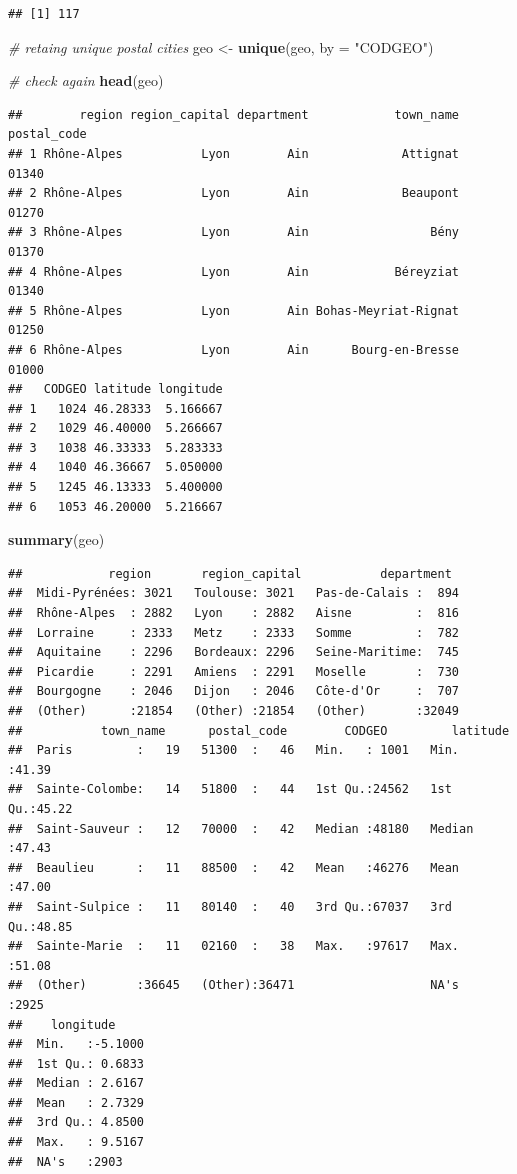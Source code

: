 \documentclass[]{article}
\newenvironment{Shaded}{\begin{snugshade}}{\end{snugshade}}
\newcommand{\KeywordTok}[1]{\textcolor[rgb]{0.13,0.29,0.53}{\textbf{#1}}}
\newcommand{\DataTypeTok}[1]{\textcolor[rgb]{0.13,0.29,0.53}{#1}}
\newcommand{\StringTok}[1]{\textcolor[rgb]{0.31,0.60,0.02}{#1}}
\newcommand{\CommentTok}[1]{\textcolor[rgb]{0.56,0.35,0.01}{\textit{#1}}}
\newcommand{\NormalTok}[1]{#1}
\begin{document}
\begin{verbatim}
## [1] 117
\end{verbatim}

\begin{Shaded}
\begin{Highlighting}[]
\CommentTok{# retaing unique postal cities}
\NormalTok{geo <-}\StringTok{ }\KeywordTok{unique}\NormalTok{(geo, }\DataTypeTok{by =} \StringTok{"CODGEO"}\NormalTok{)}

\CommentTok{# check again}
\KeywordTok{head}\NormalTok{(geo)}
\end{Highlighting}
\end{Shaded}

\begin{verbatim}
##        region region_capital department            town_name postal_code
## 1 Rhône-Alpes           Lyon        Ain             Attignat       01340
## 2 Rhône-Alpes           Lyon        Ain             Beaupont       01270
## 3 Rhône-Alpes           Lyon        Ain                 Bény       01370
## 4 Rhône-Alpes           Lyon        Ain            Béreyziat       01340
## 5 Rhône-Alpes           Lyon        Ain Bohas-Meyriat-Rignat       01250
## 6 Rhône-Alpes           Lyon        Ain      Bourg-en-Bresse       01000
##   CODGEO latitude longitude
## 1   1024 46.28333  5.166667
## 2   1029 46.40000  5.266667
## 3   1038 46.33333  5.283333
## 4   1040 46.36667  5.050000
## 5   1245 46.13333  5.400000
## 6   1053 46.20000  5.216667
\end{verbatim}

\begin{Shaded}
\begin{Highlighting}[]
\KeywordTok{summary}\NormalTok{(geo)}
\end{Highlighting}
\end{Shaded}

\begin{verbatim}
##            region       region_capital           department   
##  Midi-Pyrénées: 3021   Toulouse: 3021   Pas-de-Calais :  894  
##  Rhône-Alpes  : 2882   Lyon    : 2882   Aisne         :  816  
##  Lorraine     : 2333   Metz    : 2333   Somme         :  782  
##  Aquitaine    : 2296   Bordeaux: 2296   Seine-Maritime:  745  
##  Picardie     : 2291   Amiens  : 2291   Moselle       :  730  
##  Bourgogne    : 2046   Dijon   : 2046   Côte-d'Or     :  707  
##  (Other)      :21854   (Other) :21854   (Other)       :32049  
##           town_name      postal_code        CODGEO         latitude    
##  Paris         :   19   51300  :   46   Min.   : 1001   Min.   :41.39  
##  Sainte-Colombe:   14   51800  :   44   1st Qu.:24562   1st Qu.:45.22  
##  Saint-Sauveur :   12   70000  :   42   Median :48180   Median :47.43  
##  Beaulieu      :   11   88500  :   42   Mean   :46276   Mean   :47.00  
##  Saint-Sulpice :   11   80140  :   40   3rd Qu.:67037   3rd Qu.:48.85  
##  Sainte-Marie  :   11   02160  :   38   Max.   :97617   Max.   :51.08  
##  (Other)       :36645   (Other):36471                   NA's   :2925   
##    longitude      
##  Min.   :-5.1000  
##  1st Qu.: 0.6833  
##  Median : 2.6167  
##  Mean   : 2.7329  
##  3rd Qu.: 4.8500  
##  Max.   : 9.5167  
##  NA's   :2903
\end{verbatim}
\end{document}
